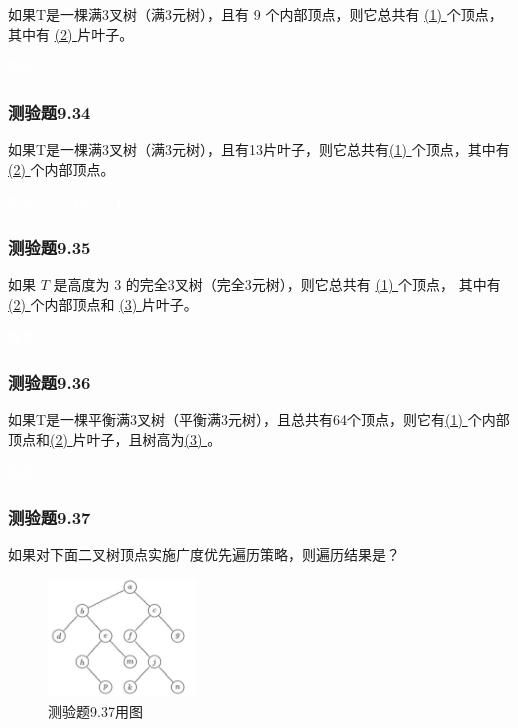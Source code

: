 \documentclass[UTF8, heading=true]{ctexart}
\begin{document}
如果T是一棵满3叉树（满3元树），且有 9 个内部顶点，则它总共有
\underline{\quad (1) \quad}个顶点，其中有 \underline{\quad (2) \quad}片叶子。

\textcolor{white}{答案：(1) 28, (2) 19}

\subsubsection{测验题9.34}

如果T是一棵满3叉树（满3元树），且有13片叶子，则它总共有\underline{\quad (1) \quad}个顶点，其中有\underline{\quad (2) \quad}个内部顶点。

\textcolor{white}{答案：(1) 19, (2) 6}

\subsubsection{测验题9.35}

如果 $T$ 是高度为 3 的完全3叉树（完全3元树），则它总共有 \underline{\quad (1) \quad}个顶点，
其中有 \underline{\quad (2) \quad}个内部顶点和 \underline{\quad (3) \quad}片叶子。

\textcolor{white}{答案：(1) 40, (2) 13, (3) 27}

\subsubsection{测验题9.36}

如果T是一棵平衡满3叉树（平衡满3元树），且总共有64个顶点，则它有\underline{\quad (1) \quad}个内部顶点和\underline{\quad (2) \quad}片叶子，且树高为\underline{\quad (3) \quad}。

\textcolor{white}{答案：(1) 21, (2) 43, (3) 4}

\subsubsection{测验题9.37}

如果对下面二叉树顶点实施广度优先遍历策略，则遍历结果是？

\begin{figure}[H]
  \centering
  \includegraphics[width=0.35\textwidth]{9.37.jpg} %
  \caption{测验题9.37用图}
\end{figure}
\end{document}
